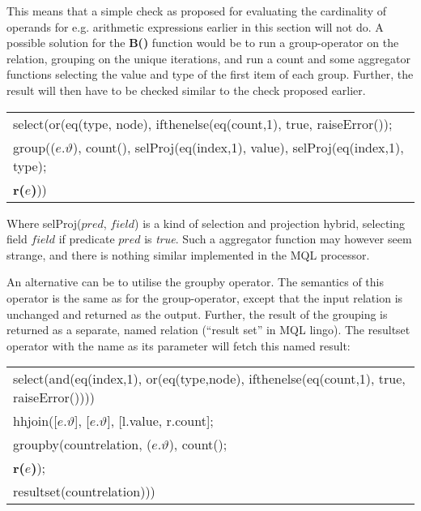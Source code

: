 This means that a simple check as proposed for evaluating the cardinality of operands for e.g. arithmetic
expressions earlier in this section will not do. A possible solution for the \textbf{B()} function would be to run
a \textsf{group}-operator on the relation, grouping on the unique iterations, and run a \textsf{count} and some
aggregator functions selecting the value and type of the first item of each group. Further, the result will then
have to be checked similar to the check proposed earlier.
\begin{center}
\begin{tabular}{l}
\textsf{select(or(eq(type, node), ifthenelse(eq(count,1), true, raiseError());} \\\quad
\textsf{group((}$e.\vartheta$\textsf{), count(), selProj(eq(index,1), value), selProj(eq(index,1), type);}
\\\quad\quad
\textbf{r(}$e$\textbf{)}\textsf{))}
\end{tabular}
\end{center}
Where \textsf{selProj(}$pred$, $field$\textsf{)} is a kind of selection and projection hybrid, selecting field
$field$ if predicate $pred$ is \textit{true}. Such a aggregator function may however seem strange, and there is
nothing similar implemented in the MQL processor.

An alternative can be to utilise the \textsf{groupby} operator. The semantics of this operator is the same as for
the \textsf{group}-operator, except that the input relation is unchanged and returned as the output. Further, the
result of the grouping is returned as a separate, named relation (``result set'' in MQL lingo). The
\textsf{resultset} operator with the name as its parameter will fetch this named result:

\begin{center}
\begin{tabular}{l}
\textsf{select(and(eq(index,1), or(eq(type,node), ifthenelse(eq(count,1), true, raiseError())))} \\ \quad 
\textsf{hhjoin([}$e.\vartheta$\textsf{], [}$e.\vartheta$\textsf{], [l.value, r.count];} \\ \quad\quad
\textsf{groupby(countrelation, (}$e.\vartheta$\textsf{), count();} \\ \quad\quad\quad
\textbf{r(}$e$\textbf{)}\textsf{);} \\ \quad\quad
\textsf{resultset(countrelation)))}
\end{tabular}
\end{center}


